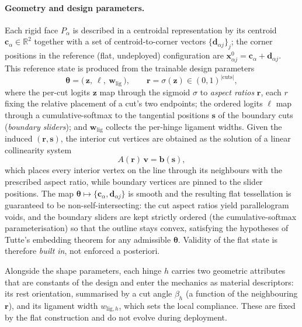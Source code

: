 \documentclass[pdflatex,sn-mathphys-num]{sn-jnl}%
\theoremstyle{thmstyleone}%
\theoremstyle{thmstyletwo}%
\theoremstyle{thmstylethree}%
\begin{document}
\paragraph{Geometry and design parameters.}
Each rigid face $P_\alpha$ is described in a centroidal representation by its
centroid $\bm{c}_\alpha \in \mathbb{R}^2$ together with a set of
centroid-to-corner vectors $\{\bm{d}_{\alpha j}\}_j$; the corner positions in the
reference (flat, undeployed) configuration are
$\bm{x}_{\alpha j}^{0} = \bm{c}_\alpha + \bm{d}_{\alpha j}$. This reference state is
produced from the trainable design parameters
\begin{equation}
  \bm{\theta} = \bigl(\, \bm{z},\ \bm{\ell},\ \bm{w}_{\mathrm{lig}}\,\bigr),
  \qquad
  \bm{r} = \sigma(\bm{z}) \in (0,1)^{\lvert\mathrm{cuts}\rvert},
  \label{eq:design-params}
\end{equation}
where the per-cut logits $\bm{z}$ map through the sigmoid $\sigma$ to \emph{aspect
ratios} $\bm{r}$, each $r$ fixing the relative placement of a cut's two endpoints;
the ordered logits $\bm{\ell}$ map through a cumulative-softmax to the tangential
positions $\bm{s}$ of the boundary cuts (\emph{boundary sliders}); and
$\bm{w}_{\mathrm{lig}}$ collects the per-hinge ligament widths. Given the induced
$(\bm{r},\bm{s})$, the interior cut vertices are obtained as the solution of a
linear collinearity system
\begin{equation}
  A(\bm{r})\,\bm{v} = \bm{b}(\bm{s}),
\end{equation}
which places every interior vertex on the line through its neighbours with the
prescribed aspect ratio, while boundary vertices are pinned to the slider
positions. The map $\bm{\theta} \mapsto \{\bm{c}_\alpha, \bm{d}_{\alpha j}\}$ is
smooth and the resulting flat tessellation is guaranteed to be
non-self-intersecting: the cut aspect ratios yield parallelogram voids, and the
boundary sliders are kept strictly ordered (the cumulative-softmax
parameterisation) so that the outline stays convex, satisfying the hypotheses of
Tutte's embedding theorem for any admissible $\bm{\theta}$. Validity of the flat
state is therefore \emph{built in}, not enforced a posteriori.

Alongside the shape parameters, each hinge $h$ carries two geometric attributes
that are constants of the design and enter the mechanics as material descriptors:
its rest orientation, summarised by a cut angle $\beta_h$ (a function of the
neighbouring $\bm{r}$), and its ligament width $w_{\mathrm{lig},h}$, which sets the
local compliance. These are fixed by the flat construction and do not evolve during
deployment.
\end{document}
